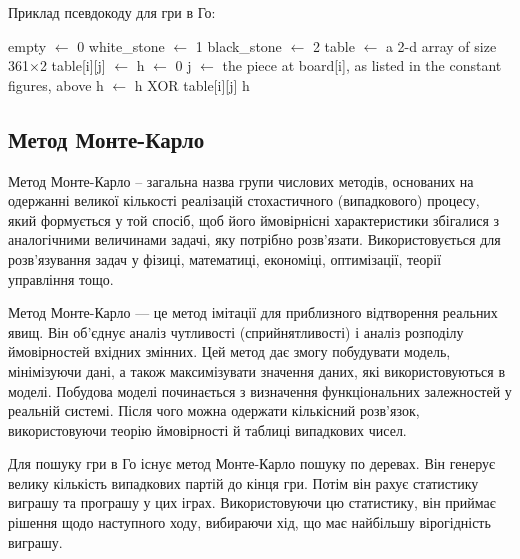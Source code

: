 Приклад псевдокоду для гри в Го:

\begin{algorithmic}
	\State empty $\gets$ 0
	\State white\_stone $\gets$ 1
	\State black\_stone $\gets$ 2
		\State table $\gets$ a 2-d array of size 361$\times$2
				\State table[i][j] $\gets$ 
			\EndFor
		\EndFor
	\EndFunction
		\State h $\gets$ 0
				\State j $\gets$ the piece at board[i], as listed in the constant figures, above
				\State h $\gets$ h XOR table[i][j]
			\EndIf
		\EndFor
		\State \Return h
	\EndFunction
\end{algorithmic}

\subsection{Метод Монте-Карло}
Метод Монте-Карло -- загальна назва групи числових методів, основаних на одержанні великої кількості реалізацій стохастичного (випадкового) процесу, який формується у той спосіб, щоб його ймовірнісні характеристики збігалися з аналогічними величинами задачі, яку потрібно розв'язати. Використовується для розв'язування задач у фізиці, математиці, економіці, оптимізації, теорії управління тощо.

Метод Монте-Карло — це метод імітації для приблизного відтворення реальних явищ. Він об'єднує аналіз чутливості (сприйнятливості) і аналіз розподілу ймовірностей вхідних змінних. Цей метод дає змогу побудувати модель, мінімізуючи дані, а також максимізувати значення даних, які використовуються в моделі. Побудова моделі починається з визначення функціональних залежностей у реальній системі. Після чого можна одержати кількісний розв'язок, використовуючи теорію ймовірності й таблиці випадкових чисел.

Для пошуку гри в Го існує метод Монте-Карло пошуку по деревах. Він генерує велику кількість випадкових партій до кінця гри. Потім він рахує статистику виграшу та програшу у цих іграх. Використовуючи цю статистику, він приймає рішення щодо наступного ходу, вибираючи хід, що має найбільшу вірогідність виграшу.

